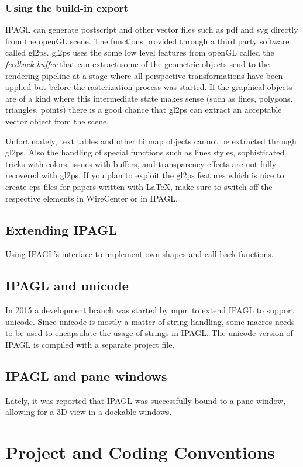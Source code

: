 \documentclass[11pt,a4paper,onepage,openany]{book}
\begin{document}
\subsection{Using the build-in export}
IPAGL can generate postscript and other vector files such as pdf and svg
directly from the openGL scene. The functions provided through a third party
software called gl2ps. gl2ps uses the some low level features from openGL
called the \emph{feedback buffer} that can extract some of the geometric
objects send to the rendering pipeline at a stage where all perspective
transformations have been applied but before the rasterization process was
started. If the graphical objects are of a kind where this intermediate state
makes sense (such as lines, polygons, triangles, points) there is a good chance
that gl2ps can extract an acceptable vector object from the scene.

Unfortunately, text tables and other bitmap objects cannot be extracted through
gl2ps. Also the handling of special functions such as lines styles,
sophisticated tricks with colors, issues with buffers, and transparency effects
are not fully recovered with gl2ps. If you plan to exploit the gl2ps features
which is nice to create eps files for papers written with LaTeX, make sure to
switch off the respective elements in WireCenter or in IPAGL.

\section{Extending IPAGL}
Using IPAGL's interface to implement own shapes and call-back functions.

\section{IPAGL and unicode}
In 2015 a development branch was started by mpm to extend IPAGL to support
unicode. Since unicode is mostly a matter of string handling, some macros needs
to be used to encapsulate the usage of strings in IPAGL. The unicode version of
IPAGL is compiled with a separate project file.

\section{IPAGL and pane windows}
Lately, it was reported that IPAGL was successfully bound to a pane window,
allowing for a 3D view in a dockable windows.


\chapter{Project and Coding Conventions}
\end{document}
